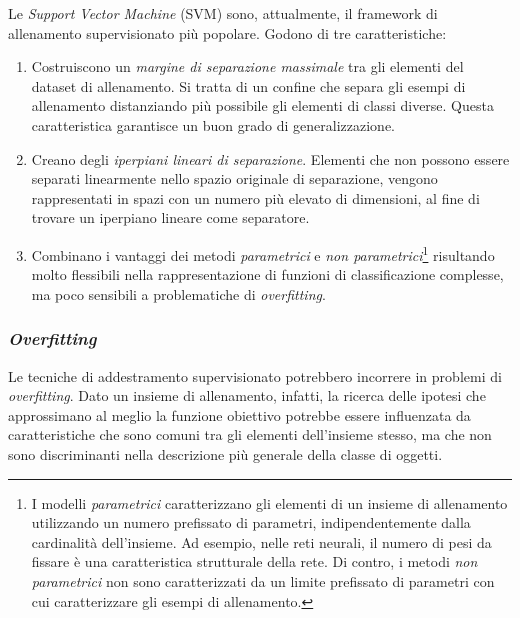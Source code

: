                 Le \emph{Support Vector Machine} (SVM) sono, attualmente, il framework di allenamento supervisionato più popolare.
                Godono di tre caratteristiche:
                \begin{enumerate}
                    \item Costruiscono un \emph{margine di separazione massimale} tra gli elementi del dataset di allenamento. Si tratta di un confine che separa gli esempi di allenamento distanziando più possibile gli elementi di classi diverse. Questa caratteristica garantisce un buon grado di generalizzazione.

                    \item Creano degli \emph{iperpiani lineari di separazione}. Elementi che non possono essere separati linearmente nello spazio originale di separazione, vengono rappresentati in spazi con un numero più elevato di dimensioni, al fine di trovare un iperpiano lineare come separatore.

                    \item Combinano i vantaggi dei metodi \emph{parametrici} e \emph{non parametrici}\footnote{I modelli \emph{parametrici} caratterizzano gli elementi di un insieme di allenamento utilizzando un numero prefissato di parametri, indipendentemente dalla cardinalità dell'insieme. 
                    Ad esempio, nelle reti neurali, il numero di pesi da fissare è una caratteristica strutturale della rete.
                    Di contro, i metodi \emph{non parametrici} non sono caratterizzati da un limite prefissato di parametri con cui caratterizzare gli esempi di allenamento.} risultando molto flessibili nella rappresentazione di funzioni di classificazione complesse, ma poco sensibili a problematiche di \emph{overfitting}.
                \end{enumerate}

            \subsubsection{\emph{Overfitting}}
                Le tecniche di addestramento supervisionato potrebbero incorrere in problemi di \emph{overfitting}.
                Dato un insieme di allenamento, infatti, la ricerca delle ipotesi che approssimano al meglio la funzione obiettivo potrebbe essere influenzata da caratteristiche che sono comuni tra gli elementi dell'insieme stesso, ma che non sono discriminanti nella descrizione più generale della classe di oggetti.

